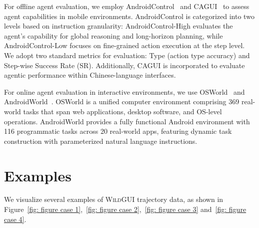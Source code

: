 \documentclass{llmxive}
\providecommand{\ourdataset}{\textsc{WildGUI}\xspace}
\begin{document}
For offline agent evaluation, we employ AndroidControl~\citep{li2024effects} and CAGUI~\citep{zhang2025agentcpm} to assess agent capabilities in mobile environments. AndroidControl is categorized into two levels based on instruction granularity: AndroidControl-High evaluates the agent's capability for global reasoning and long-horizon planning, while AndroidControl-Low focuses on fine-grained action execution at the step level. We adopt two standard metrics for evaluation: Type (action type accuracy) and Step-wise Success Rate (SR). Additionally, CAGUI is incorporated to evaluate agentic performance within Chinese-language interfaces.

For online agent evaluation in interactive environments, we use OSWorld~\citep{xie2024osworld} and AndroidWorld~\citep{rawles2024androidworld}. OSWorld is a unified computer environment comprising 369 real-world tasks that span web applications, desktop software, and OS-level operations. AndroidWorld provides a fully functional Android environment with 116 programmatic tasks across 20 real-world apps, featuring dynamic task construction with parameterized natural language instructions.

\section{Examples}
\label{sec: examples}
We visualize several examples of \ourdataset{} trajectory data, as shown in Figure~\ref{fig: figure case 1},~\ref{fig: figure case 2},~\ref{fig: figure case 3} and~\ref{fig: figure case 4}.
\end{document}
